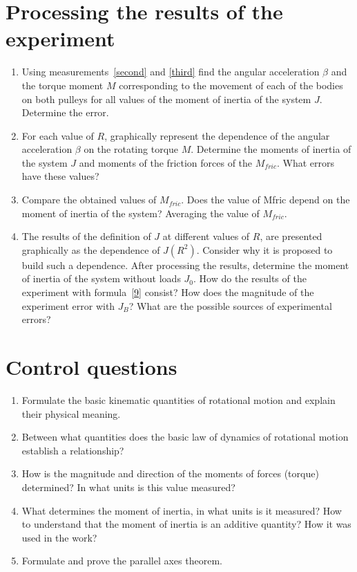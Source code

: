 \documentclass{LabWorkEng}
\begin{document}
\section{Processing the results of the experiment}

\begin{enumerate}
	\item Using measurements~\ref{second} and \ref{third} find the angular acceleration $\beta$ and the torque moment $M$ corresponding to the movement of each of the bodies on both pulleys for all values of the moment of inertia of the system $J$. Determine the error.
	\item For each value of $R$, graphically represent the dependence of the angular acceleration $\beta$ on the rotating torque $M$. Determine the moments of inertia of the system $J$ and moments of the friction forces of the $M_{fric}$. What errors have these values?
	\item Compare the obtained values of $M_{fric}$. Does the value of Mfric depend on the moment of inertia of the system? Averaging the value of  $M_{fric}$.
	\item The results of the definition of $J$ at different values of $R$, are presented graphically as the dependence of  $J(R^2)$. Consider why it is proposed to build such a dependence. After processing the results, determine the moment of inertia of the system without loads $J_0$. How do the results of the experiment with formula~\eqref{9} consist? How does the magnitude of the experiment error with $J_B$? What are the possible sources of experimental errors?
\end{enumerate}

\section*{Control questions}

\begin{enumerate}
	\item Formulate the basic kinematic quantities of rotational motion and explain their physical meaning.
	\item Between what quantities does the basic law of dynamics of rotational motion establish a relationship?
	\item How is the magnitude and direction of the moments of forces (torque) determined? In what units is this value measured?
	\item What determines the moment of inertia, in what units is it measured? How to understand that the moment of inertia is an additive quantity? How it was used in the work?
	\item Formulate and prove the parallel axes theorem.
\end{enumerate}
\end{document}
